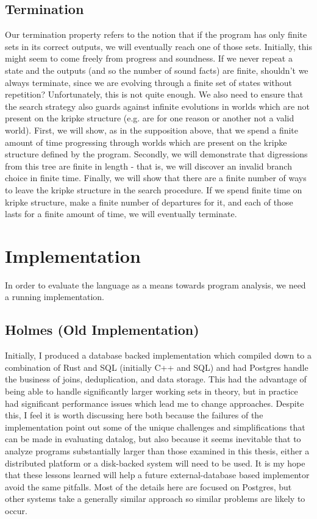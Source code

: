 \subsection{Termination}
\label{sec:term} 
Our termination property refers to the notion that if the program has only finite sets in its correct outputs, we will eventually reach one of those sets.
Initially, this might seem to come freely from progress and soundness.
If we never repeat a state and the outputs (and so the number of sound facts) are finite, shouldn't we always terminate, since we are evolving through a finite set of states without repetition?
Unfortunately, this is not quite enough.
We also need to ensure that the search strategy also guards against infinite evolutions in worlds which are not present on the kripke structure (e.g. are for one reason or another not a valid world).
First, we will show, as in the supposition above, that we spend a finite amount of time progressing through worlds which are present on the kripke structure defined by the program.
Secondly, we will demonstrate that digressions from this tree are finite in length - that is, we will discover an invalid branch choice in finite time.
Finally, we will show that there are a finite number of ways to leave the kripke structure in the search procedure. 
If we spend finite time on kripke structure, make a finite number of departures for it, and each of those lasts for a finite amount of time, we will eventually terminate.

\section{Implementation}
In order to evaluate the language as a means towards program analysis, we need a running implementation.
\subsection{Holmes (Old Implementation)}
Initially, I produced a database backed implementation which compiled down to a combination of Rust and SQL (initially C++ and SQL) and had Postgres handle the business of joins, deduplication, and data storage.
This had the advantage of being able to handle significantly larger working sets in theory, but in practice had significant performance issues which lead me to change approaches.
Despite this, I feel it is worth discussing here both because the failures of the implementation point out some of the unique challenges and simplifications that can be made in evaluating datalog, but also because it seems inevitable that to analyze programs substantially larger than those examined in this thesis, either a distributed platform or a disk-backed system will need to be used.
It is my hope that these lessons learned will help a future external-database based implementor avoid the same pitfalls.
Most of the details here are focused on Postgres, but other systems take a generally similar approach so similar problems are likely to occur.

